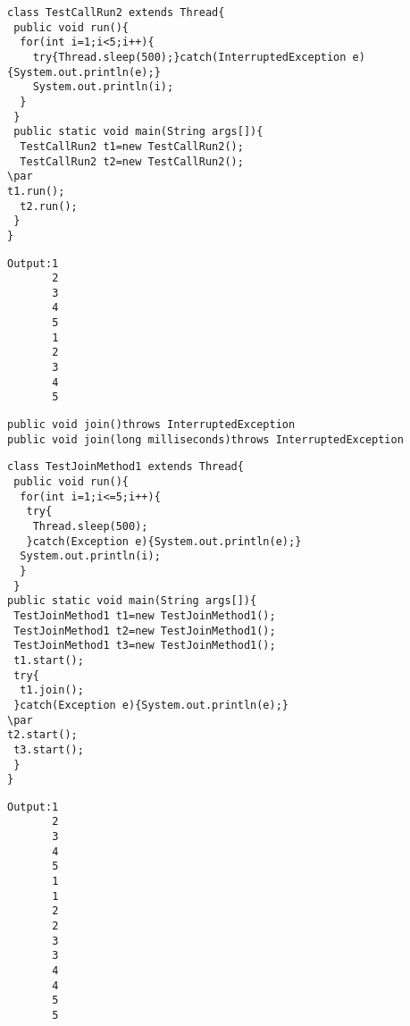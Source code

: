 \documentclass{book}
\def\lthtmlcheckvsize{\ifdim\ht\sizebox<\vsize 
  \ifdim\wd\sizebox<\hsize\expandafter\hfill\fi \expandafter\vfill
  \else\expandafter\vss\fi}%
\begin{document}
{\newpage\clearpage
{}%
\begin{lstlisting}
class TestCallRun2 extends Thread{  
 public void run(){  
  for(int i=1;i<5;i++){  
    try{Thread.sleep(500);}catch(InterruptedException e){System.out.println(e);}  
    System.out.println(i);  
  }  
 }  
 public static void main(String args[]){  
  TestCallRun2 t1=new TestCallRun2();  
  TestCallRun2 t2=new TestCallRun2();  
\par
t1.run();  
  t2.run();  
 }  
}  
\end{lstlisting}%
\lthtmlfigureZ
\lthtmlcheckvsize\clearpage}

{\newpage\clearpage
{}%
\begin{lstlisting}
Output:1
       2
       3
       4
       5
       1
       2
       3
       4
       5
 \end{lstlisting}%
\lthtmlfigureZ
\lthtmlcheckvsize\clearpage}

{\newpage\clearpage
{}%
\begin{lstlisting}
public void join()throws InterruptedException
public void join(long milliseconds)throws InterruptedException
\end{lstlisting}%
\lthtmlfigureZ
\lthtmlcheckvsize\clearpage}

{\newpage\clearpage
{}%
\begin{lstlisting}
class TestJoinMethod1 extends Thread{  
 public void run(){  
  for(int i=1;i<=5;i++){  
   try{  
    Thread.sleep(500);  
   }catch(Exception e){System.out.println(e);}  
  System.out.println(i);  
  }  
 }  
public static void main(String args[]){  
 TestJoinMethod1 t1=new TestJoinMethod1();  
 TestJoinMethod1 t2=new TestJoinMethod1();  
 TestJoinMethod1 t3=new TestJoinMethod1();  
 t1.start();  
 try{  
  t1.join();  
 }catch(Exception e){System.out.println(e);}  
\par
t2.start();  
 t3.start();  
 }  
}  
\end{lstlisting}%
\lthtmlfigureZ
\lthtmlcheckvsize\clearpage}

{\newpage\clearpage
{}%
\begin{lstlisting}
Output:1
       2
       3
       4
       5
       1
       1
       2
       2
       3
       3
       4
       4
       5
       5
\end{lstlisting}%
\lthtmlfigureZ
\lthtmlcheckvsize\clearpage}
\end{document}
